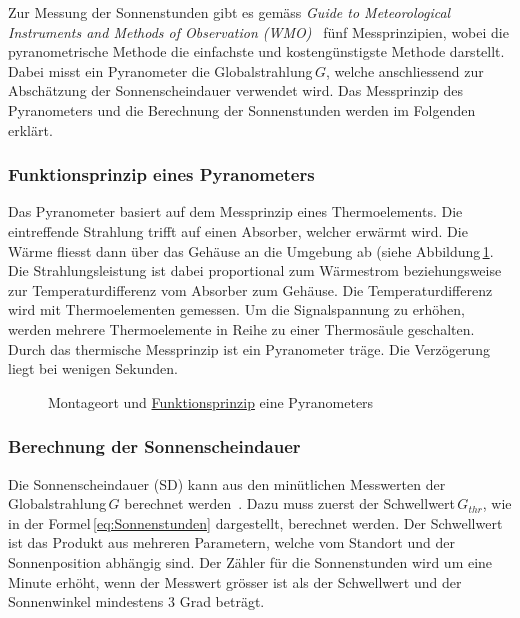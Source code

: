 \noindent
Zur Messung der Sonnenstunden gibt es gemäss \emph{Guide to Meteorological Instruments and Methods of Observation (WMO)}~\cite{WMO2014Gtmi} fünf Messprinzipien, wobei die pyranometrische Methode die einfachste und kostengünstigste Methode darstellt. Dabei misst ein Pyranometer die Globalstrahlung\,$G$, welche anschliessend zur Abschätzung der Sonnenscheindauer verwendet wird. Das Messprinzip des Pyranometers und die Berechnung der Sonnenstunden werden im Folgenden erklärt.

\subsubsection{Funktionsprinzip eines Pyranometers}
Das Pyranometer basiert auf dem Messprinzip eines Thermoelements. Die eintreffende Strahlung trifft auf einen Absorber, welcher erwärmt wird. Die Wärme fliesst dann über das Gehäuse an die Umgebung ab (siehe Abbildung\,\ref{img:pyranometer}. Die Strahlungsleistung ist dabei proportional zum Wärmestrom beziehungsweise zur Temperaturdifferenz vom Absorber zum Gehäuse. Die Temperaturdifferenz wird mit Thermoelementen gemessen. Um die Signalspannung zu erhöhen, werden mehrere Thermoelemente in Reihe zu einer Thermosäule geschalten. Durch das thermische Messprinzip ist ein Pyranometer träge. Die Verzögerung liegt bei wenigen Sekunden.

\begin{figure}[htbp]
	\centering
	\caption{Montageort und \href{http://www.kippzonen.com/News/572/The-Working-Principle-of-a-Thermopile-Pyranometer}{Funktionsprinzip} eine Pyranometers }
	\label{img:pyranometer}
\end{figure}


\subsubsection{Berechnung der Sonnenscheindauer}
Die Sonnenscheindauer (SD) kann aus den minütlichen Messwerten der Globalstrahlung\,$G$ berechnet werden~\cite{WMO2014Gtmi}. Dazu muss zuerst der Schwellwert\,$G_{thr}$, wie in der Formel\,\ref{eq:Sonnenstunden} dargestellt, berechnet werden. Der Schwellwert ist das Produkt aus mehreren Parametern, welche vom Standort und der Sonnenposition abhängig sind. Der Zähler für die Sonnenstunden wird um eine Minute erhöht, wenn der Messwert grösser ist als der Schwellwert und der Sonnenwinkel mindestens 3 Grad beträgt.

